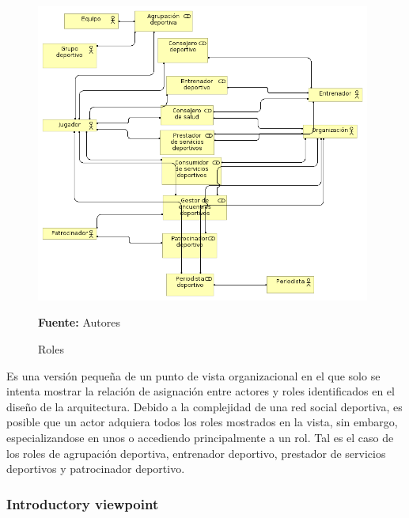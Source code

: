 \begin{figure}[!htb]
  \begin{center}
    \includegraphics[width=11cm]{./imagenes/Archimate/vistas/generales/roles.png}
    \caption{Roles}
    \label{fig:Roles}
    \textbf{Fuente:}  Autores
  \end{center}
\end{figure}

Es una versión pequeña de un punto de vista organizacional en el que solo se intenta mostrar la relación de asignación entre actores y roles identificados en el diseño de la arquitectura. Debido a la complejidad de una red social deportiva, es posible que un actor adquiera todos los roles mostrados en la vista, sin embargo, especializandose en unos o accediendo principalmente a un rol. Tal es el caso de los roles de agrupación deportiva, entrenador deportivo, prestador de servicios deportivos y patrocinador deportivo.

\subsubsection{Introductory viewpoint}

